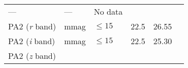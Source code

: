 \documentclass[DM,toc]{lsstdoc}
\begin{document}
\begin{longtable}[]{@{}llllll@{}}
\begin{minipage}[t]{0.17\columnwidth}
---\strut
\end{minipage} & \begin{minipage}[t]{0.12\columnwidth}\raggedright\strut
---\strut
\end{minipage} & \begin{minipage}[t]{0.17\columnwidth}\raggedright\strut
No data\strut
\end{minipage}\tabularnewline
\begin{minipage}[t]{0.14\columnwidth}\raggedright\strut
PA2 (\emph{r} band)\strut
\end{minipage} & \begin{minipage}[t]{0.06\columnwidth}\raggedright\strut
mmag\strut
\end{minipage} & \begin{minipage}[t]{0.17\columnwidth}\raggedright\strut
\(\leq 15\)\strut
\end{minipage} & \begin{minipage}[t]{0.17\columnwidth}\raggedright\strut
22.5\strut
\end{minipage} & \begin{minipage}[t]{0.12\columnwidth}\raggedright\strut
26.55\strut
\end{minipage} & \begin{minipage}[t]{0.17\columnwidth}\raggedright\strut
\strut
\end{minipage}\tabularnewline
\begin{minipage}[t]{0.14\columnwidth}\raggedright\strut
PA2 (\emph{i} band)\strut
\end{minipage} & \begin{minipage}[t]{0.06\columnwidth}\raggedright\strut
mmag\strut
\end{minipage} & \begin{minipage}[t]{0.17\columnwidth}\raggedright\strut
\(\leq 15\)\strut
\end{minipage} & \begin{minipage}[t]{0.17\columnwidth}\raggedright\strut
22.5\strut
\end{minipage} & \begin{minipage}[t]{0.12\columnwidth}\raggedright\strut
25.30\strut
\end{minipage} & \begin{minipage}[t]{0.17\columnwidth}\raggedright\strut
\strut
\end{minipage}\tabularnewline
\begin{minipage}[t]{0.14\columnwidth}\raggedright\strut
PA2 (\emph{z} band)\strut
\end{minipage} & \begin{minipage}[t]{0.06\columnwidth}\raggedright\strut

\end{minipage}
\end{longtable}
\end{document}
